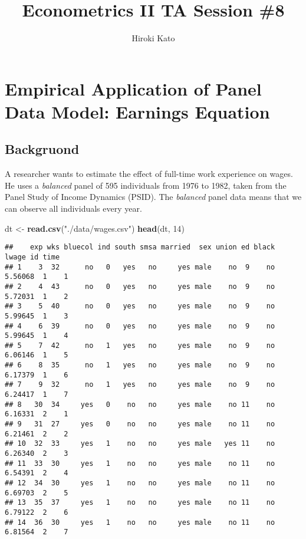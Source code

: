 \documentclass[
  12pt,
]{article}
\title{Econometrics II TA Session \#8}
\author{Hiroki Kato}
\date{}
\newenvironment{Shaded}{\begin{snugshade}}{\end{snugshade}}
\newcommand{\DecValTok}[1]{\textcolor[rgb]{0.00,0.00,0.81}{#1}}
\newcommand{\KeywordTok}[1]{\textcolor[rgb]{0.13,0.29,0.53}{\textbf{#1}}}
\newcommand{\NormalTok}[1]{#1}
\newcommand{\StringTok}[1]{\textcolor[rgb]{0.31,0.60,0.02}{#1}}
\begin{document}
\maketitle

\hypertarget{empirical-application-of-panel-data-model-earnings-equation}{%
\section{Empirical Application of Panel Data Model: Earnings
Equation}\label{empirical-application-of-panel-data-model-earnings-equation}}

\hypertarget{backgruond}{%
\subsection{Backgruond}\label{backgruond}}

A researcher wants to estimate the effect of full-time work experience
on wages. He uses a \emph{balanced} panel of 595 individuals from 1976
to 1982, taken from the Panel Study of Income Dynamics (PSID). The
\emph{balanced} panel data means that we can observe all individuals
every year.

\begin{Shaded}
\begin{Highlighting}[]
\NormalTok{dt \textless{}{-}}\StringTok{ }\KeywordTok{read.csv}\NormalTok{(}\StringTok{"./data/wages.csv"}\NormalTok{)}
\KeywordTok{head}\NormalTok{(dt, }\DecValTok{14}\NormalTok{)}
\end{Highlighting}
\end{Shaded}

\begin{verbatim}
##    exp wks bluecol ind south smsa married  sex union ed black   lwage id time
## 1    3  32      no   0   yes   no     yes male    no  9    no 5.56068  1    1
## 2    4  43      no   0   yes   no     yes male    no  9    no 5.72031  1    2
## 3    5  40      no   0   yes   no     yes male    no  9    no 5.99645  1    3
## 4    6  39      no   0   yes   no     yes male    no  9    no 5.99645  1    4
## 5    7  42      no   1   yes   no     yes male    no  9    no 6.06146  1    5
## 6    8  35      no   1   yes   no     yes male    no  9    no 6.17379  1    6
## 7    9  32      no   1   yes   no     yes male    no  9    no 6.24417  1    7
## 8   30  34     yes   0    no   no     yes male    no 11    no 6.16331  2    1
## 9   31  27     yes   0    no   no     yes male    no 11    no 6.21461  2    2
## 10  32  33     yes   1    no   no     yes male   yes 11    no 6.26340  2    3
## 11  33  30     yes   1    no   no     yes male    no 11    no 6.54391  2    4
## 12  34  30     yes   1    no   no     yes male    no 11    no 6.69703  2    5
## 13  35  37     yes   1    no   no     yes male    no 11    no 6.79122  2    6
## 14  36  30     yes   1    no   no     yes male    no 11    no 6.81564  2    7
\end{verbatim}
\end{document}
